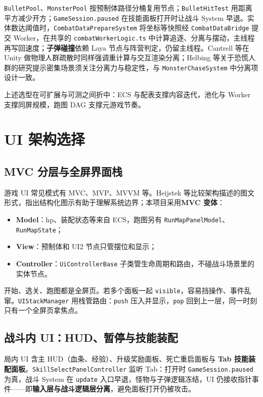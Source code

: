 \texttt{BulletPool}、\texttt{MonsterPool} 按预制体路径分桶复用节点；\texttt{BulletHitTest} 用距离平方减少开方；\texttt{GameSession.paused} 在技能面板打开时让战斗 System 早退。实体数达阈值时，\texttt{CombatDataPrepareSystem} 将坐标等快照经 \texttt{CombatDataBridge} 提交 Worker，在共享的 \texttt{combatWorkerLogic.ts} 中计算追逐、分离与摆动，主线程再写回速度；\textbf{子弹碰撞}依赖 Laya 节点与阵营判定，仍留主线程。Cantrell 等在 Unity 做物理人群疏散时同样强调重计算与交互渲染分离\cite{cantrell2018unity}；Helbing 等关于恐慌人群的研究提示密集场景须关注分离力与稳定性\cite{helbing2000panic}，与 \texttt{MonsterChaseSystem} 中分离项设计一致。

上述选型在可扩展与可测之间折中：ECS 与配表支撑内容迭代，池化与 Worker 支撑同屏规模，跑图 DAG 支撑元游戏节奏。

\section{UI 架构选择}
\label{sec:ui-arch}

\subsection{MVC 分层与全屏界面栈}

游戏 UI 常见模式有 MVC、MVP、MVVM 等\cite{heijstek2011empirical}。Heijstek 等比较架构描述的图文形式，指出结构化图示有助于理解系统边界；本项目采用\textbf{MVC 变体}：

\begin{itemize}
  \item \textbf{Model}：hp、装配状态等来自 ECS，跑图另有 \texttt{RunMapPanelModel}、\texttt{RunMapState}；
  \item \textbf{View}：预制体和 UI2 节点只管摆位和显示；
  \item \textbf{Controller}：\texttt{UiControllerBase} 子类管生命周期和路由，不碰战斗场景里的实体节点。
\end{itemize}

开始、选关、跑图都是全屏页。若多个面板一起 \texttt{visible}，容易挡操作、事件乱窜。\texttt{UIStackManager} 用栈管路由：\texttt{push} 压入并显示，\texttt{pop} 回到上一层，同一时刻只有一个全屏页拿焦点\cite{gregory2018game}。

\subsection{战斗内 UI：HUD、暂停与技能装配}

局内 UI 含主 HUD（血条、经验）、升级奖励面板、死亡重启面板与 \textbf{Tab 技能装配面板}。\texttt{SkillSelectPanelController} 监听 Tab：打开时 \texttt{GameSession.paused} 为真，战斗 System 在 \texttt{update} 入口早退，怪物与子弹逻辑冻结，UI 仍接收指针事件——即\textbf{输入层与战斗逻辑层分离}，避免面板打开仍被攻击。

